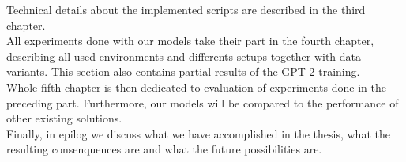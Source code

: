 Technical details about the implemented scripts are described in the third chapter.\\

All experiments done with our models take their part in the fourth chapter, describing all used environments and differents setups together with data variants. This section also contains partial results of the GPT-2 training.\\

Whole fifth chapter is then dedicated to evaluation of experiments done in the preceding part. Furthermore, our models will be compared to the performance of other existing solutions.\\

Finally, in epilog we discuss what we have accomplished in the thesis, what the resulting consenquences are and what the future possibilities are.